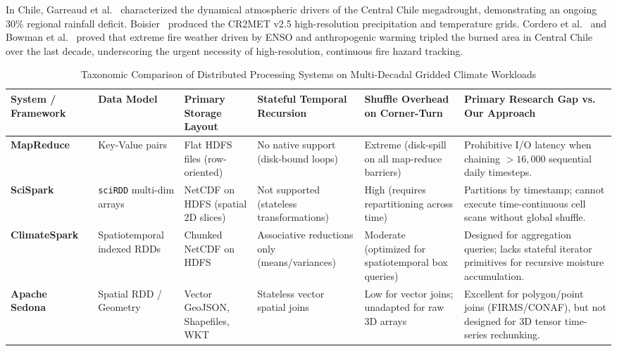 \documentclass[10pt,conference]{IEEEtran}
\begin{document}
In Chile, Garreaud et al.~\cite{garreaud2020central} characterized the dynamical atmospheric drivers of the Central Chile megadrought, demonstrating an ongoing $30\%$ regional rainfall deficit. Boisier~\cite{boisier2023cr2met} produced the CR2MET v2.5 high-resolution precipitation and temperature grids. Cordero et al.~\cite{cordero2024extreme} and Bowman et al.~\cite{bowman2019human} proved that extreme fire weather driven by ENSO and anthropogenic warming tripled the burned area in Central Chile over the last decade, underscoring the urgent necessity of high-resolution, continuous fire hazard tracking.

\begin{table}[t]
\centering
\caption{Taxonomic Comparison of Distributed Processing Systems on Multi-Decadal Gridded Climate Workloads}
\label{tab:taxonomy}
\small
\begin{tabularx}{\textwidth}{l p{2.0cm} p{2.0cm} X X p{3.8cm}}
\toprule
\textbf{System / Framework} & \textbf{Data Model} & \textbf{Primary Storage Layout} & \textbf{Stateful Temporal Recursion} & \textbf{Shuffle Overhead on Corner-Turn} & \textbf{Primary Research Gap vs. Our Approach} \\
\midrule
\textbf{MapReduce}~\cite{dean2008mapreduce} & Key-Value pairs & Flat HDFS files (row-oriented) & No native support (disk-bound loops) & Extreme (disk-spill on all map-reduce barriers) & Prohibitive I/O latency when chaining $>16,000$ sequential daily timesteps. \\
\addlinespace
\textbf{SciSpark}~\cite{palamuttam2015scispark} & \texttt{sciRDD} multi-dim arrays & NetCDF on HDFS (spatial 2D slices) & Not supported (stateless transformations) & High (requires repartitioning across time) & Partitions by timestamp; cannot execute time-continuous cell scans without global shuffle. \\
\addlinespace
\textbf{ClimateSpark}~\cite{hu2018climatespark} & Spatiotemporal indexed RDDs & Chunked NetCDF on HDFS & Associative reductions only (means/variances) & Moderate (optimized for spatiotemporal box queries) & Designed for aggregation queries; lacks stateful iterator primitives for recursive moisture accumulation. \\
\addlinespace
\textbf{Apache Sedona}~\cite{yu2018spatial} & Spatial RDD / Geometry & Vector GeoJSON, Shapefiles, WKT & Stateless vector spatial joins & Low for vector joins; unadapted for raw 3D arrays & Excellent for polygon/point joins (FIRMS/CONAF), but not designed for 3D tensor time-series rechunking. \\

\end{tabularx}
\end{table}
\end{document}
